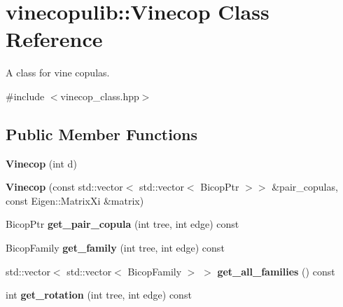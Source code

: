 \hypertarget{classvinecopulib_1_1_vinecop}{}\section{vinecopulib\+:\+:Vinecop Class Reference}
\label{classvinecopulib_1_1_vinecop}


A class for vine copulas.  




{\ttfamily \#include $<$vinecop\+\_\+class.\+hpp$>$}

\subsection*{Public Member Functions}
\begin{DoxyCompactItemize}
\item 
{\bfseries Vinecop} (int d)\hypertarget{classvinecopulib_1_1_vinecop_a7c6bae90feba9d70bf692e4d50d02bc7}{}\label{classvinecopulib_1_1_vinecop_a7c6bae90feba9d70bf692e4d50d02bc7}

\item 
{\bfseries Vinecop} (const std\+::vector$<$ std\+::vector$<$ Bicop\+Ptr $>$$>$ \&pair\+\_\+copulas, const Eigen\+::\+Matrix\+Xi \&matrix)\hypertarget{classvinecopulib_1_1_vinecop_a37559eece324ec4ecf8ae13c6eb82a3c}{}\label{classvinecopulib_1_1_vinecop_a37559eece324ec4ecf8ae13c6eb82a3c}

\item 
Bicop\+Ptr {\bfseries get\+\_\+pair\+\_\+copula} (int tree, int edge) const \hypertarget{classvinecopulib_1_1_vinecop_a0c121e831581227e6ed75387d1babfff}{}\label{classvinecopulib_1_1_vinecop_a0c121e831581227e6ed75387d1babfff}

\item 
Bicop\+Family {\bfseries get\+\_\+family} (int tree, int edge) const \hypertarget{classvinecopulib_1_1_vinecop_ab2b5aecbe06c5219919f5b3c7436f1da}{}\label{classvinecopulib_1_1_vinecop_ab2b5aecbe06c5219919f5b3c7436f1da}

\item 
std\+::vector$<$ std\+::vector$<$ Bicop\+Family $>$ $>$ {\bfseries get\+\_\+all\+\_\+families} () const \hypertarget{classvinecopulib_1_1_vinecop_a8b07344bedafeb618982f480240a5f15}{}\label{classvinecopulib_1_1_vinecop_a8b07344bedafeb618982f480240a5f15}

\item 
int {\bfseries get\+\_\+rotation} (int tree, int edge) const \hypertarget{classvinecopulib_1_1_vinecop_abfa48760cc636cadce6fa875a883922a}{}\label{classvinecopulib_1_1_vinecop_abfa48760cc636cadce6fa875a883922a}


\end{DoxyCompactItemize}
